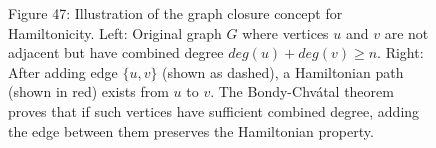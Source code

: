 \documentclass{article}
\theoremstyle{definition}
\def\deg{deg}%
\begin{document}
\begin{figure}[h!]

\begin{center}
\small Figure 47: Illustration of the graph closure concept for Hamiltonicity. Left: Original graph $G$ where vertices $u$ and $v$ are not adjacent but have combined degree $\deg(u) + \deg(v) \geq n$. Right: After adding edge $\{u,v\}$ (shown as dashed), a Hamiltonian path (shown in red) exists from $u$ to $v$. The Bondy-Chvátal theorem proves that if such vertices have sufficient combined degree, adding the edge between them preserves the Hamiltonian property.
\end{center}
\end{figure}
\end{document}
